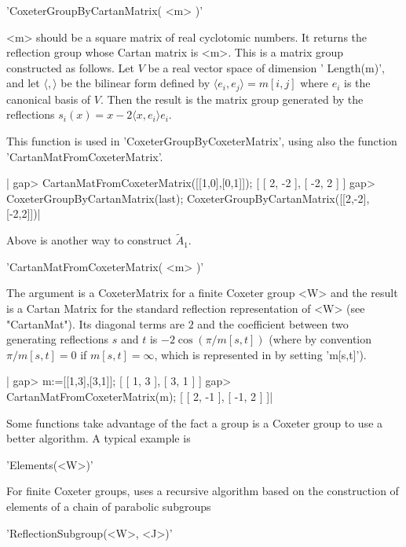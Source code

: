 'CoxeterGroupByCartanMatrix( <m> )'

<m>  should be a square  matrix of real cyclotomic  numbers. It returns the
reflection  group  whose  Cartan  matrix  is  <m>.  This  is a matrix group
constructed  as follows.  Let $V$  be a  real vector  space of  dimension '
Length(m)',  and  let  $\langle,\rangle$  be  the  bilinear form defined by
$\langle e_i, e_j\rangle=m[i,j]$ where $e_i$ is the canonical basis of $V$.
Then   the  result  is  the  matrix  group  generated  by  the  reflections
$s_i(x)=x-2\langle x, e_i\rangle e_i$.

This  function  is  used  in  'CoxeterGroupByCoxeterMatrix', using also the
function 'CartanMatFromCoxeterMatrix'.

|    gap> CartanMatFromCoxeterMatrix([[1,0],[0,1]]);
    [ [ 2, -2 ], [ -2, 2 ] ]
    gap> CoxeterGroupByCartanMatrix(last);
    CoxeterGroupByCartanMatrix([[2,-2],[-2,2]])|

Above is another way to construct $\tilde A_1$.


'CartanMatFromCoxeterMatrix( <m> )'

The  argument is  a CoxeterMatrix  for a  finite Coxeter  group <W> and the
result is a Cartan Matrix for the standard reflection representation of <W>
(see  "CartanMat"). Its diagonal terms are  $2$ and the coefficient between
two  generating reflections $s$  and $t$ is  $-2\cos(\pi/m[s,t])$ (where by
convention  $\pi/m[s,t]=0$  if  $m[s,t]=\infty$,  which  is  represented in
{\CHEVIE} by setting 'm[s,t]').

|    gap> m:=[[1,3],[3,1]];
    [ [ 1, 3 ], [ 3, 1 ] ]
    gap> CartanMatFromCoxeterMatrix(m);
    [ [ 2, -1 ], [ -1, 2 ] ]|


Some functions take advantage of the fact a group is a Coxeter group to
use a better algorithm. A typical example is\:

'Elements(<W>)'

For  finite Coxeter  groups, uses  a  recursive algorithm  based on  the
construction of elements of a chain of parabolic subgroups

'ReflectionSubgroup(<W>, <J>)'

